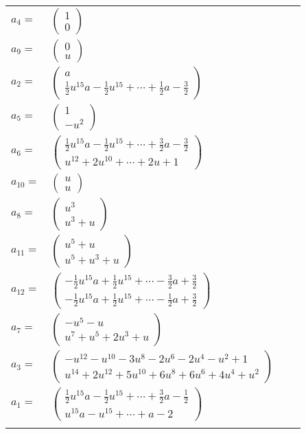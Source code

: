 \documentclass[1p]{elsarticle_modified}
\theoremstyle{definition}
\begin{document}
\begin{tabular}{m{7pt} m{180pt} m{7pt} m{180pt} }
\flushright $a_{4}=$&$\begin{pmatrix}1\\0\end{pmatrix}$ \\
\flushright $a_{9}=$&$\begin{pmatrix}0\\u\end{pmatrix}$ \\
\flushright $a_{2}=$&$\begin{pmatrix}a\\\frac{1}{2} u^{15} a-\frac{1}{2} u^{15}+\cdots+\frac{1}{2} a-\frac{3}{2}\end{pmatrix}$ \\
\flushright $a_{5}=$&$\begin{pmatrix}1\\- u^2\end{pmatrix}$ \\
\flushright $a_{6}=$&$\begin{pmatrix}\frac{1}{2} u^{15} a-\frac{1}{2} u^{15}+\cdots+\frac{3}{2} a-\frac{3}{2}\\u^{12}+2 u^{10}+\cdots+2 u+1\end{pmatrix}$ \\
\flushright $a_{10}=$&$\begin{pmatrix}u\\u\end{pmatrix}$ \\
\flushright $a_{8}=$&$\begin{pmatrix}u^3\\u^3+u\end{pmatrix}$ \\
\flushright $a_{11}=$&$\begin{pmatrix}u^5+u\\u^5+u^3+u\end{pmatrix}$ \\
\flushright $a_{12}=$&$\begin{pmatrix}-\frac{1}{2} u^{15} a+\frac{1}{2} u^{15}+\cdots-\frac{3}{2} a+\frac{3}{2}\\-\frac{1}{2} u^{15} a+\frac{1}{2} u^{15}+\cdots-\frac{1}{2} a+\frac{3}{2}\end{pmatrix}$ \\
\flushright $a_{7}=$&$\begin{pmatrix}- u^5- u\\u^7+u^5+2 u^3+u\end{pmatrix}$ \\
\flushright $a_{3}=$&$\begin{pmatrix}- u^{12}- u^{10}-3 u^8-2 u^6-2 u^4- u^2+1\\u^{14}+2 u^{12}+5 u^{10}+6 u^8+6 u^6+4 u^4+u^2\end{pmatrix}$ \\
\flushright $a_{1}=$&$\begin{pmatrix}\frac{1}{2} u^{15} a-\frac{1}{2} u^{15}+\cdots+\frac{3}{2} a-\frac{1}{2}\\u^{15} a- u^{15}+\cdots+a-2\end{pmatrix}$\\&\end{tabular}
\end{document}
